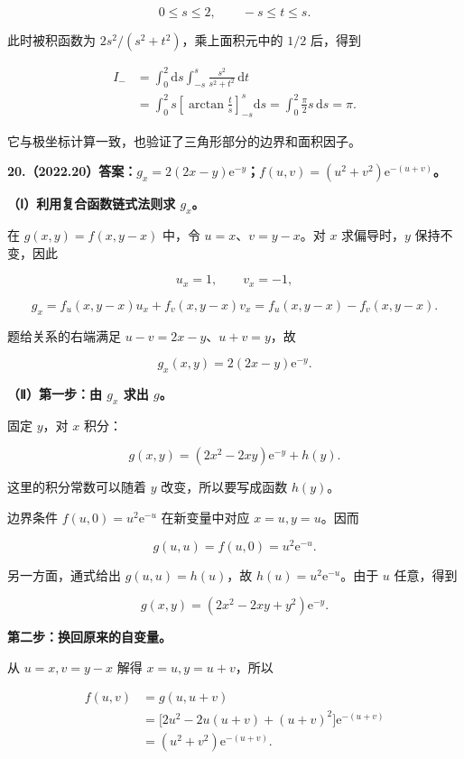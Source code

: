 \documentclass[UTF8,11pt,fontset=windows]{ctexart}
\begin{document}
$$
0\le s\le2,\qquad -s\le t\le s.
$$

此时被积函数为 $2s^2/(s^2+t^2)$，乘上面积元中的 $1/2$ 后，得到

$$
\begin{aligned}
I_-
&=\int_0^2\mathrm ds\int_{-s}^{s}\frac{s^2}{s^2+t^2}\,\mathrm dt\\
&=\int_0^2s\left[\arctan\frac ts\right]_{-s}^{s}\mathrm ds
=\int_0^2\frac\pi2s\,\mathrm ds=\pi.
\end{aligned}
$$

它与极坐标计算一致，也验证了三角形部分的边界和面积因子。

\clearpage

\textbf{20.（2022.20）答案：$g_x=2(2x-y)\mathrm e^{-y}$；$f(u,v)=(u^2+v^2)\mathrm e^{-(u+v)}$。}

\textbf{（Ⅰ）利用复合函数链式法则求 $g_x$。}

在 $g(x,y)=f(x,y-x)$ 中，令 $u=x$、$v=y-x$。对 $x$ 求偏导时，$y$ 保持不变，因此

$$
u_x=1,\qquad v_x=-1,
$$

$$
g_x=f_u(x,y-x)u_x+f_v(x,y-x)v_x
=f_u(x,y-x)-f_v(x,y-x).
$$

题给关系的右端满足 $u-v=2x-y$、$u+v=y$，故

$$
\boxed{g_x(x,y)=2(2x-y)\mathrm e^{-y}}.
$$

\textbf{（Ⅱ）第一步：由 $g_x$ 求出 $g$。}

固定 $y$，对 $x$ 积分：

$$
g(x,y)=(2x^2-2xy)\mathrm e^{-y}+h(y).
$$

这里的积分常数可以随着 $y$ 改变，所以要写成函数 $h(y)$。

边界条件 $f(u,0)=u^2\mathrm e^{-u}$ 在新变量中对应 $x=u,y=u$。因而

$$
g(u,u)=f(u,0)=u^2\mathrm e^{-u}.
$$

另一方面，通式给出 $g(u,u)=h(u)$，故 $h(u)=u^2\mathrm e^{-u}$。由于 $u$ 任意，得到

$$
g(x,y)=(2x^2-2xy+y^2)\mathrm e^{-y}.
$$

\textbf{第二步：换回原来的自变量。}

从 $u=x,v=y-x$ 解得 $x=u,y=u+v$，所以

$$
\begin{aligned}
f(u,v)&=g(u,u+v)\\
&=\bigl[2u^2-2u(u+v)+(u+v)^2\bigr]\mathrm e^{-(u+v)}\\
&=\boxed{(u^2+v^2)\mathrm e^{-(u+v)}}.
\end{aligned}
$$
\end{document}
